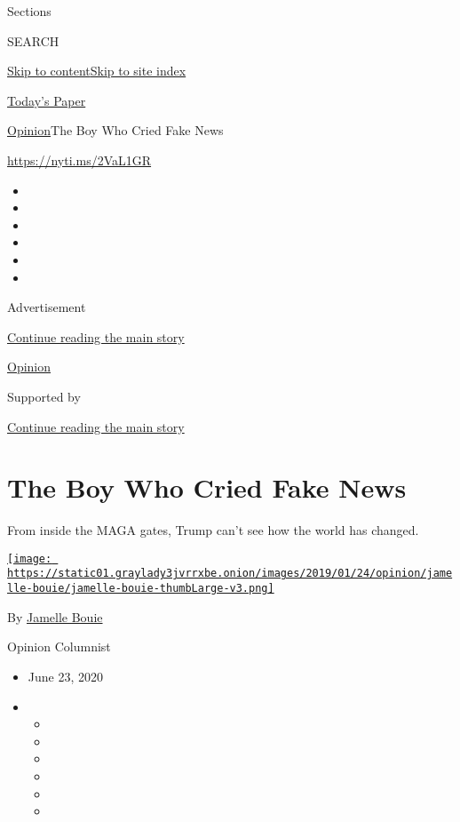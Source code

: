 Sections

SEARCH

\protect\hyperlink{site-content}{Skip to
content}\protect\hyperlink{site-index}{Skip to site index}

\href{https://myaccount.nytimes3xbfgragh.onion/auth/login?response_type=cookie\&client_id=vi}{}

\href{https://www.nytimes3xbfgragh.onion/section/todayspaper}{Today's
Paper}

\href{/section/opinion}{Opinion}\textbar{}The Boy Who Cried Fake News

\href{https://nyti.ms/2VaL1GR}{https://nyti.ms/2VaL1GR}

\begin{itemize}
\item
\item
\item
\item
\item
\item
\end{itemize}

Advertisement

\protect\hyperlink{after-top}{Continue reading the main story}

\href{/section/opinion}{Opinion}

Supported by

\protect\hyperlink{after-sponsor}{Continue reading the main story}

\hypertarget{the-boy-who-cried-fake-news}{%
\section{The Boy Who Cried Fake
News}\label{the-boy-who-cried-fake-news}}

From inside the MAGA gates, Trump can't see how the world has changed.

\href{https://www.nytimes3xbfgragh.onion/column/jamelle-bouie}{\texttt{[image: https://static01.graylady3jvrrxbe.onion/images/2019/01/24/opinion/jamelle-bouie/jamelle-bouie-thumbLarge-v3.png]}}

By
\href{https://www.nytimes3xbfgragh.onion/column/jamelle-bouie}{Jamelle
Bouie}

Opinion Columnist

\begin{itemize}
\item
  June 23, 2020
\item
  \begin{itemize}
  \item
  \item
  \item
  \item
  \item
  \item
  \end{itemize}
\end{itemize}

